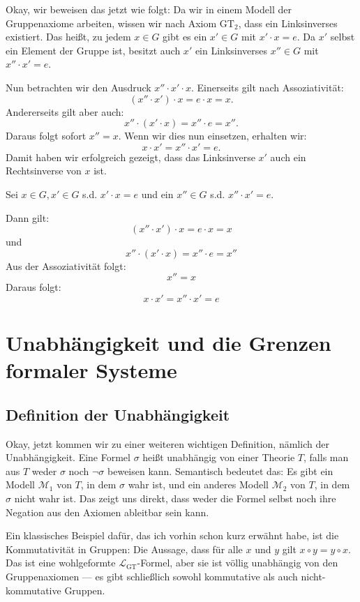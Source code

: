 \begin{spoken-clean}[00:53:36 - 00:57:27]
Okay, wir beweisen das jetzt wie folgt: Da wir in einem Modell der Gruppenaxiome arbeiten, wissen wir nach Axiom $\text{GT}_2$, dass ein Linksinverses existiert. Das heißt, zu jedem $x \in G$ gibt es ein $x' \in G$ mit $x' \cdot x = e$. Da $x'$ selbst ein Element der Gruppe ist, besitzt auch $x'$ ein Linksinverses $x'' \in G$ mit $x'' \cdot x' = e$.

Nun betrachten wir den Ausdruck $x'' \cdot x' \cdot x$. Einerseits gilt nach Assoziativität:
\[ (x'' \cdot x') \cdot x = e \cdot x = x. \]
Andererseits gilt aber auch:
\[ x'' \cdot (x' \cdot x) = x'' \cdot e = x''. \]
Daraus folgt sofort $x'' = x$. Wenn wir dies nun einsetzen, erhalten wir:
\[ x \cdot x' = x'' \cdot x' = e. \]
Damit haben wir erfolgreich gezeigt, dass das Linksinverse $x'$ auch ein Rechtsinverse von $x$ ist.
\end{spoken-clean}

\begin{math-stroke}
\begin{short-proof}
Sei $x \in G, x' \in G$ s.d. $x' \cdot x = e$ und ein $x'' \in G$ s.d. $x'' \cdot x' = e$.

Dann gilt:
\[ (x'' \cdot x') \cdot x = e \cdot x = x \]
und
\[ x'' \cdot (x' \cdot x) = x'' \cdot e = x'' \]
Aus der Assoziativität folgt:
\[ x'' = x \]
Daraus folgt:
\[ x \cdot x' = x'' \cdot x' = e \]
\end{short-proof}
\end{math-stroke}


\section{Unabhängigkeit und die Grenzen formaler Systeme}
\subsection{Definition der Unabhängigkeit}

\begin{spoken-clean}[00:57:27 - 00:59:17]
Okay, jetzt kommen wir zu einer weiteren wichtigen Definition, nämlich der Unabhängigkeit. Eine Formel $\sigma$ heißt unabhängig von einer Theorie $T$, falls man aus $T$ weder $\sigma$ noch $\neg\sigma$ beweisen kann. Semantisch bedeutet das: Es gibt ein Modell $\mathcal{M}_1$ von $T$, in dem $\sigma$ wahr ist, und ein anderes Modell $\mathcal{M}_2$ von $T$, in dem $\sigma$ nicht wahr ist. Das zeigt uns direkt, dass weder die Formel selbst noch ihre Negation aus den Axiomen ableitbar sein kann.

Ein klassisches Beispiel dafür, das ich vorhin schon kurz erwähnt habe, ist die Kommutativität in Gruppen: Die Aussage, dass für alle $x$ und $y$ gilt $x \circ y = y \circ x$. Das ist eine wohlgeformte $\mathcal{L}_{\text{GT}}$-Formel, aber sie ist völlig unabhängig von den Gruppenaxiomen --- es gibt schließlich sowohl kommutative als auch nicht-kommutative Gruppen.
\end{spoken-clean}

